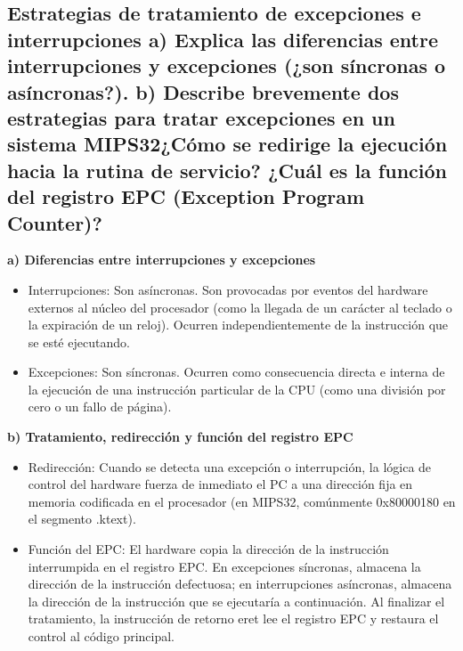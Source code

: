 \documentclass[12pt, a4paper]{article}
\begin{document}
\subsection{Estrategias de tratamiento de excepciones e interrupciones a) Explica las diferencias entre interrupciones y excepciones (¿son síncronas o asíncronas?). b) Describe brevemente dos estrategias para tratar excepciones en un sistema MIPS32¿Cómo se redirige la ejecución hacia la rutina de servicio? ¿Cuál es la función del registro EPC (Exception Program Counter)?}
    \textbf{a) Diferencias entre interrupciones y excepciones}
    \begin{itemize}
        \item Interrupciones: Son asíncronas. Son provocadas por eventos del hardware externos al núcleo del procesador (como la llegada de un carácter al teclado o la expiración de un reloj). Ocurren independientemente de la instrucción que se esté ejecutando.
        \item Excepciones: Son síncronas. Ocurren como consecuencia directa e interna de la ejecución de una instrucción particular de la CPU (como una división por cero o un fallo de página).
    \end{itemize}
    \textbf{b) Tratamiento, redirección y función del registro EPC}
    \begin{itemize}
        \item Redirección: Cuando se detecta una excepción o interrupción, la lógica de control del hardware fuerza de inmediato el PC a una dirección fija en memoria codificada en el procesador (en MIPS32, comúnmente 0x80000180 en el segmento .ktext).
        \item Función del EPC: El hardware copia la dirección de la instrucción interrumpida en el registro EPC. En excepciones síncronas, almacena la dirección de la instrucción defectuosa; en interrupciones asíncronas, almacena la dirección de la instrucción que se ejecutaría a continuación. Al finalizar el tratamiento, la instrucción de retorno eret lee el registro EPC y restaura el control al código principal.
    \end{itemize}
\end{document}

